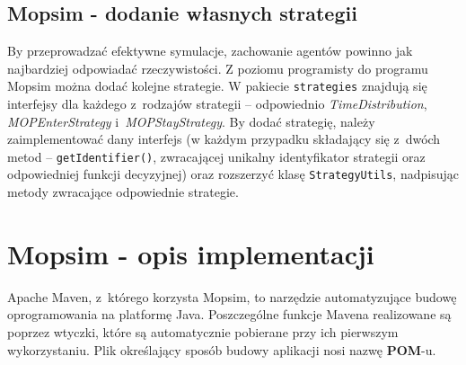 \subsection{Mopsim - dodanie własnych strategii}
By przeprowadzać efektywne symulacje, zachowanie agentów powinno jak najbardziej odpowiadać rzeczywistości. Z poziomu programisty do programu Mopsim można dodać kolejne strategie. W pakiecie \texttt{strategies} znajdują się interfejsy dla każdego z~rodzajów strategii -- odpowiednio \textit{TimeDistribution}, \textit{MOPEnterStrategy} i~\textit{MOPStayStrategy}. By dodać strategię, należy zaimplementować dany interfejs (w każdym przypadku składający się z~dwóch metod -- \texttt{getIdentifier()}, zwracającej unikalny identyfikator strategii oraz odpowiedniej funkcji decyzyjnej) oraz rozszerzyć klasę \texttt{StrategyUtils}, nadpisując metody zwracające odpowiednie strategie.

\section[Opis implementacji]{Mopsim - opis implementacji}
Apache Maven, z~którego korzysta Mopsim, to narzędzie automatyzujące budowę oprogramowania na platformę Java. Poszczególne funkcje Mavena realizowane są poprzez wtyczki, które są automatycznie pobierane przy ich pierwszym wykorzystaniu. Plik określający sposób budowy aplikacji nosi nazwę \textbf{POM}-u.

\begin{figure}[!htb]
\label{mopsim_structure}
\end{figure}
